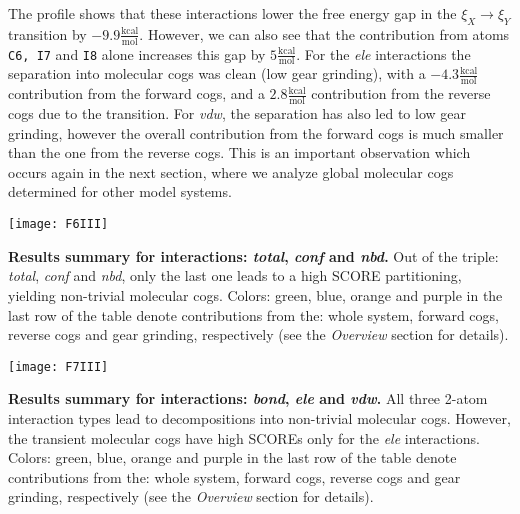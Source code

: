 The profile shows that these interactions lower the free energy gap in the $\xi_X\to\xi_Y$ transition by $-9.9\frac{\text{kcal}}{\text{mol}}$.
However, we can {\color{black}also} see that {\color{black}the contribution from} atoms \texttt{C6, I7} and \texttt{I8} alone increases this gap by $5\frac{\text{kcal}}{\text{mol}}$.
{\color{black}For the \emph{ele} interactions} the separation into molecular cogs was clean (low gear grinding), with a $-4.3\frac{\text{kcal}}{\text{mol}}$ contribution from the forward cogs, and a $2.8\frac{\text{kcal}}{\text{mol}}$ contribution from the reverse cogs due to the transition.
{\color{black}For \emph{vdw}, the separation has also led to low gear grinding, however the overall contribution from the forward cogs is much smaller than the one from the reverse cogs.
This is an important observation which occurs again in the next section, where we analyze global molecular cogs determined for other model systems.
}

{
\centering
\begin{table}
\centering
\texttt{[image: F6III]}
\caption{{\bf Results summary for interactions: \emph{total}, \emph{conf} and \emph{nbd}.} 
Out of the triple: \emph{total}, \emph{conf} and \emph{nbd}, only the last one leads to a high SCORE partitioning, yielding non-trivial molecular cogs.
{\color{black}Colors: green, blue, orange and purple in the last row of the table denote contributions from the: whole system, forward cogs, reverse cogs and gear grinding, respectively (see the \emph{Overview} section for details).}
}
\label{tab:resultsI}
\end{table}
}

{
\centering
\begin{table}
\centering
\texttt{[image: F7III]}
\caption{{\bf Results summary for interactions: \emph{bond}, \emph{ele} and \emph{vdw}.} 
All three 2-atom interaction types lead to decompositions into non-trivial molecular cogs.
{\color{black}However, the transient molecular cogs have high SCOREs only for the \emph{ele} interactions.
Colors: green, blue, orange and purple in the last row of the table denote contributions from the: whole system, forward cogs, reverse cogs and gear grinding, respectively (see the \emph{Overview} section for details).}
}
\label{tab:resultsII}
\end{table}
}

